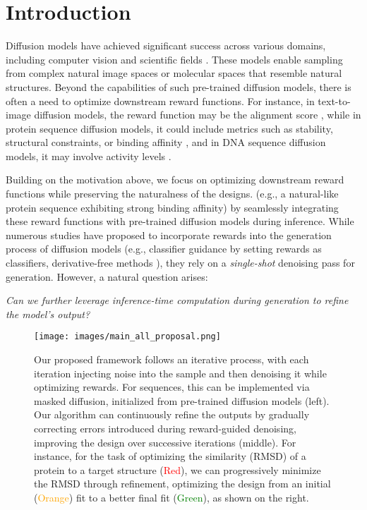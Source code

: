 \vspace{-2mm}
\section{Introduction}


Diffusion models have achieved significant success across various domains, including computer vision and scientific fields \citep{ramesh2021zero,watson2023novo}.
These models enable sampling from complex natural image spaces or molecular spaces that resemble natural structures. Beyond the capabilities of such pre-trained diffusion models, there is often a need to optimize downstream reward functions. For instance, in text-to-image diffusion models, the reward function may be the alignment score \citep{black2023training,fan2023dpok,uehara2024feedback}, while in protein sequence diffusion models, it could include metrics such as stability, structural constraints, or binding affinity \citep{verkuil2022language}, and in DNA sequence diffusion models, it may involve activity levels \citep{sarkar2024designing,lal2024reglm}.






 
Building on the motivation above, we focus on optimizing downstream reward functions while preserving the naturalness of the designs. (e.g., a natural-like protein sequence exhibiting strong binding affinity) by seamlessly integrating these reward functions with pre-trained diffusion models during inference. While numerous studies have proposed to incorporate rewards 
into the generation process of diffusion models (e.g., classifier guidance \citep{dhariwal2021diffusion} by setting rewards as classifiers, derivative-free methods \citep{wu2024practical,li2024derivative}), they rely on a \emph{single-shot} denoising pass for generation. However, a natural question arises:

\emph{Can we further leverage inference-time computation during generation to refine the model’s output?}

\begin{figure}[!t]
    \centering
    \texttt{[image: images/main\_all\_proposal.png]}
    \caption{
    Our proposed framework follows an iterative process, with each iteration injecting noise into the sample and then denoising it while optimizing rewards. For sequences, this can be implemented via masked diffusion, initialized from pre-trained diffusion models (left). Our algorithm can continuously refine the outputs by gradually correcting errors introduced during reward-guided denoising, improving the design over successive iterations (middle). For instance, for the task of optimizing the similarity (RMSD) of a protein to a target structure (\textcolor{red}{Red}), we can progressively minimize the RMSD through refinement, optimizing the design from an initial (\textcolor{orange}{Orange}) fit to a better final fit (\textcolor{green}{Green}), as shown on the right.} 
    \label{fig:propsoal}
\end{figure}

